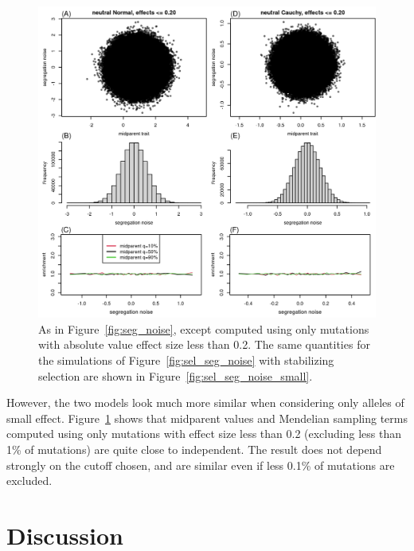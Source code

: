 \documentclass{article}
\newcommand{\1}{\mathbbm{1}}
\theoremstyle{remark}
\theoremstyle{definition}
\begin{document}
\begin{figure}
    \begin{center}
        \includegraphics{sims/neutral_seg_noise_small}
    \end{center}
    \caption{
        As in Figure~\ref{fig:seg_noise},
        except computed using only mutations with absolute value effect size less than 0.2.
        The same quantities for the simulations of Figure~\ref{fig:sel_seg_noise}
        with stabilizing selection are shown in Figure~\ref{fig:sel_seg_noise_small}.
        \label{fig:seg_noise_small}
    }
\end{figure}


However,
the two models look much more similar when considering only alleles of small effect.
Figure~\ref{fig:seg_noise_small} shows that midparent values
and Mendelian sampling terms computed using only mutations with effect size less than 0.2
(excluding less than 1\% of mutations)
are quite close to independent.
The result does not depend strongly on the cutoff chosen,
and are similar even if less 0.1\% of mutations are excluded.

\section{Discussion}
\end{document}
